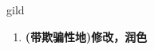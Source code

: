 
\begin{frame}
{\huge gild}
\begin{center}
\begin{enumerate}\Large
  \item \textbf{(带欺骗性地)修改，润色}
\end{enumerate}
\end{center}
\end{frame}

